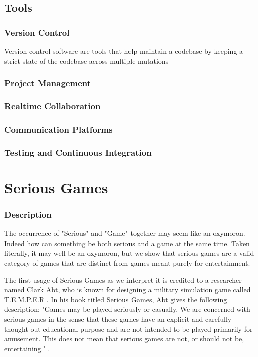 \documentclass[11pt]{article}
\begin{document}
    \subsection{Tools}
        \subsubsection{Version Control}
        Version control software are tools that help maintain a codebase by keeping a strict state of the codebase across multiple mutations 
        \subsubsection{Project Management}
        \subsubsection{Realtime Collaboration}
        \subsubsection{Communication Platforms}
        \subsubsection{Testing and Continuous Integration}

\section{Serious Games}
    \subsubsection{Description}
    The occurrence of "Serious" and "Game" together may seem like an oxymoron. Indeed how can something be both serious and a game at the same time. Taken literally, it may well be an oxymoron, but we show that serious games are a valid category of games that are distinct from games meant purely for entertainment.
    
    The first usage of Serious Games as we interpret it is credited to a researcher named Clark Abt, who is known for designing a military simulation game called T.E.M.P.E.R \citet{origins}. In his book titled Serious Games, Abt gives the following description: "Games may be played seriously or casually. We are concerned with serious games in the sense that these games have an explicit and carefully thought-out educational purpose and are not intended to be played primarily for amusement. This does not mean that serious games are not, or should not be, entertaining." \citet{origins}.
\end{document}
